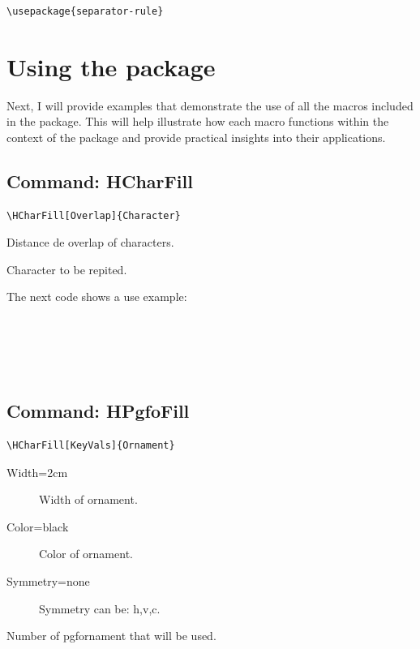 \documentclass[a4paper,10pt]{article}
\newcommand{\EXAMPLEOFSEPARATORRULE}[1]{%
\medskip
\noindent The next code shows a use example:
\begin{mdframed}[backgroundcolor=black!10,rightline=false,leftline=false]
\noindent\texttt{\detokenize{\lipsum[1][1-4]}}\\

\noindent\texttt{\detokenize{#1}}\\

\noindent\texttt{\detokenize{\lipsum[1][1-4]}}
\end{mdframed}

\medskip
\noindent
\lipsum[1][1-4]

#1

\lipsum[1][1-4]
~\\
\medskip
}
\begin{document}
\begin{mdframed}[backgroundcolor=black!10,rightline=false,leftline=false]
\begin{verbatim}
\usepackage{separator-rule}
\end{verbatim}
\end{mdframed}
\vspace{-2ex}

\vspace{-2ex}
\section{Using the package}
Next, I will provide examples that demonstrate the use of all the macros included in the package. 
This will help illustrate how each macro functions within the context of the package and provide 
practical insights into their applications.

\vspace{-2ex}
\subsection{Command: HCharFill }
\begin{verbatim}
\HCharFill[Overlap]{Character}
\end{verbatim}
\begin{mydescription}
 \item[Overlap:] Distance de overlap of characters.
 \item[Character:] Character to be repited.
\end{mydescription}
\EXAMPLEOFSEPARATORRULE{\noindent{}}

\subsection{Command: HPgfoFill }
\begin{verbatim}
\HCharFill[KeyVals]{Ornament}
\end{verbatim}
\begin{mydescription}
 \item[KeyVals:] 
    \begin{description}
     \item[Width=2cm] Width of ornament.
     \item[Color=black] Color of ornament.
     \item[Symmetry=none] Symmetry can be: h,v,c.
     \end{description}
 \item[Ornament:] Number of pgfornament that will be used.
\end{mydescription}
\end{document}

